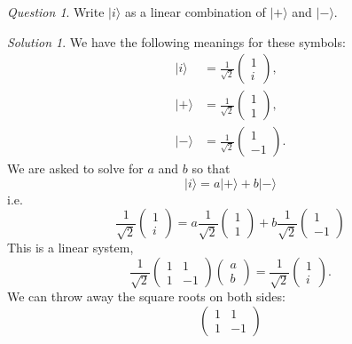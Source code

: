 \documentclass{article}
\theoremstyle{plain}
\theoremstyle{definition}
\theoremstyle{remark}
\newtheorem{question}[theorem]{Question}
\newtheorem*{solution}{Solution}
\numberwithin{theorem}{section}
\begin{document}
\begin{question} 
Write $|i\rangle$ as a linear combination of $|+\rangle$ and $|-\rangle$.
\end{question}

\begin{solution}

		We have the following meanings for these symbols: 
		\begin{align*}
			|i\rangle &= \frac{1}{\sqrt{2}}\begin{pmatrix} 1 \\ i \end{pmatrix}, \\
			|+\rangle &=
\frac{1}{\sqrt{2}}\begin{pmatrix} 1 \\ 1 \end{pmatrix}, \\
			|-\rangle &= 
\frac{1}{\sqrt{2}}\begin{pmatrix} 1 \\ -1 \end{pmatrix}.
		\end{align*}
		We are asked to solve for $a$ and $b$ so that
		\[
			|i\rangle = a |+ \rangle + b | - \rangle
		\]
		i.e. 
		\[
			\frac{1}{\sqrt{2}}\begin{pmatrix} 1 \\ i \end{pmatrix} =
			a \frac{1}{\sqrt{2}}\begin{pmatrix} 1 \\ 1 \end{pmatrix} +
			b \frac{1}{\sqrt{2}}\begin{pmatrix} 1 \\ -1 \end{pmatrix}
		\]
		This is a linear system,
		\[
			\frac{1}{\sqrt{2}}
			\begin{pmatrix}
				1 & 1 \\
				1 & -1 
			\end{pmatrix}
			\begin{pmatrix}
				a \\ b 
			\end{pmatrix}
			=
			\frac{1}{\sqrt{2}}
			\begin{pmatrix}
				1 \\
				i
			\end{pmatrix}.
		\]
		We can throw away the square roots on both sides:
		\[
			\begin{pmatrix}
				1 & 1 \\
				1 & -1 

\end{pmatrix}\]
\end{solution}
\end{document}

